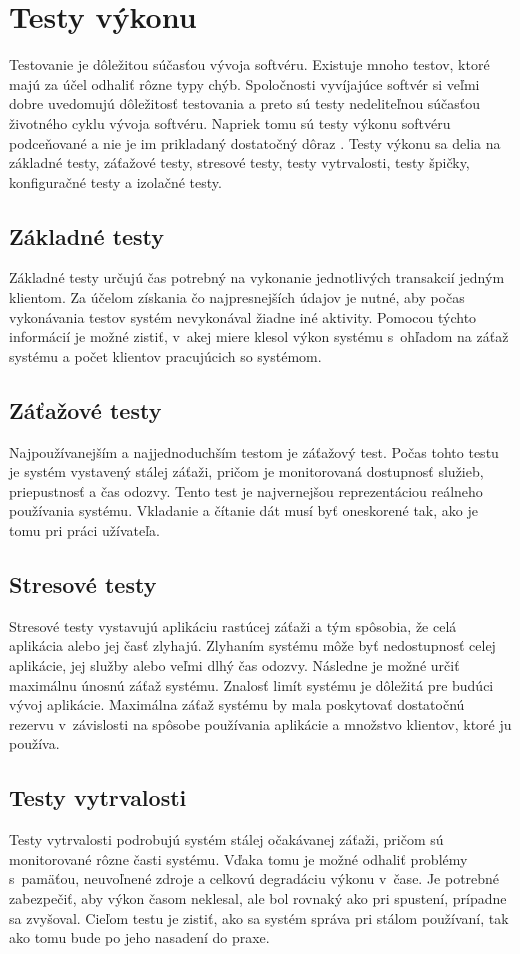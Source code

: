 \documentclass[12pt,oneside,final]{fithesis-utf8}
\begin{document}
\chapter{Testy výkonu}
Testovanie je dôležitou súčasťou vývoja softvéru. Existuje mnoho testov, ktoré majú za účel odhaliť rôzne typy chýb. Spoločnosti vyvíjajúce softvér si veľmi dobre uvedomujú dôležitosť testovania a preto sú testy nedeliteľnou súčasťou životného cyklu vývoja softvéru. Napriek tomu sú testy výkonu softvéru podceňované a nie je im prikladaný dostatočný dôraz \cite{Art}.
Testy výkonu sa delia na základné testy, záťažové testy, stresové testy, testy vytrvalosti, testy špičky, konfiguračné testy a izolačné testy.	

\section{Základné testy}
Základné testy určujú čas potrebný na vykonanie jednotlivých transakcií jedným klientom. Za účelom získania čo najpresnejších údajov je nutné, aby počas vykonávania testov systém nevykonával žiadne iné aktivity. Pomocou týchto informácií je možné zistiť, v~akej miere klesol výkon systému s~ohľadom na záťaž systému a počet klientov pracujúcich so systémom.

\section{Záťažové testy}
Najpoužívanejším a najjednoduchším testom je záťažový test. Počas tohto testu je systém vystavený stálej záťaži, pričom je monitorovaná dostupnosť služieb, priepustnosť a čas odozvy. Tento test je najvernejšou reprezentáciou reálneho používania systému. Vkladanie a čítanie dát musí byť oneskorené tak, ako je tomu pri práci užívateľa.

\section{Stresové testy}
Stresové testy vystavujú aplikáciu rastúcej záťaži a tým spôsobia, že celá aplikácia alebo jej časť zlyhajú. Zlyhaním systému môže byť nedostupnosť celej aplikácie, jej služby alebo veľmi dlhý čas odozvy. Následne je možné určiť maximálnu únosnú záťaž systému. Znalosť limít systému je dôležitá pre budúci vývoj aplikácie. Maximálna záťaž systému by mala poskytovať dostatočnú rezervu v~závislosti na spôsobe používania aplikácie a množstvo klientov, ktoré ju používa. 

\section{Testy vytrvalosti}
Testy vytrvalosti podrobujú systém stálej očakávanej záťaži, pričom sú monitorované rôzne časti systému. Vďaka tomu je možné odhaliť problémy s~pamäťou, neuvoľnené zdroje a celkovú degradáciu výkonu v~čase. Je potrebné zabezpečiť, aby výkon časom neklesal, ale bol rovnaký ako pri spustení, prípadne sa zvyšoval. Cieľom testu je zistiť, ako sa systém správa pri stálom používaní, tak ako tomu bude po jeho nasadení do praxe. 
\end{document}
